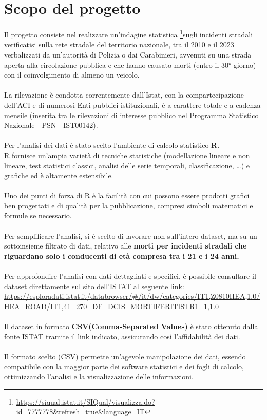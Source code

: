 \documentclass[14pt, openany, titlepage]{report} %
\begin{document}
\section{Scopo del progetto}
Il progetto consiste nel realizzare un’indagine statistica \footnote{\url{https://siqual.istat.it/SIQual/visualizza.do?id=7777778&refresh=true&language=IT}}sugli incidenti stradali verificatisi sulla rete stradale del territorio nazionale, tra il 2010 e il 2023 verbalizzati da un'autorità di Polizia o dai Carabinieri, 
avvenuti su una strada aperta alla circolazione pubblica e che hanno causato morti (entro il 30° giorno) con il coinvolgimento 
di almeno un veicolo. \\\\
\noindent
La rilevazione è condotta correntemente dall’Istat, con la compartecipazione dell'ACI e di numerosi Enti pubblici istituzionali, 
è a carattere totale e a cadenza mensile (inserita tra le rilevazioni di interesse pubblico nel Programma Statistico Nazionale - PSN - IST00142). \\\\
\noindent
Per l'analisi dei dati è stato scelto l'ambiente di calcolo statistico \textbf{R}. \\
R fornisce un'ampia varietà di tecniche statistiche (modellazione lineare e non lineare, test statistici classici, analisi delle serie temporali, classificazione, \dots)
e grafiche ed è altamente estensibile.\\\\
\noindent
Uno dei punti di forza di R è la facilità con cui possono essere prodotti grafici ben progettati e di qualità per la pubblicazione, 
compresi simboli matematici e formule se necessario.\\\\
\noindent
Per semplificare l'analisi, si è scelto di lavorare non sull'intero dataset, 
ma su un sottoinsieme filtrato di dati, relativo alle \textbf{morti per incidenti stradali che riguardano solo i conducenti di età compresa tra i 21 e i 24 anni.}\\\\
\noindent
Per approfondire l'analisi con dati dettagliati e specifici, è possibile consultare il dataset direttamente sul sito dell'ISTAT al seguente link:
\url{https://esploradati.istat.it/databrowser/#/it/dw/categories/IT1,Z0810HEA,1.0/HEA_ROAD/IT1,41_270_DF_DCIS_MORTIFERITISTR1_1,1.0}\\\\
\noindent
Il dataset in formato \textbf{CSV(Comma-Separated Values)} è stato ottenuto dalla fonte ISTAT tramite il link indicato, assicurando così l'affidabilità dei dati.\\\\
Il formato scelto (CSV) permette un'agevole manipolazione dei dati, essendo compatibile con la maggior parte dei software statistici e
dei fogli di calcolo, ottimizzando l'analisi e la visualizzazione delle informazioni.\\
\end{document}
